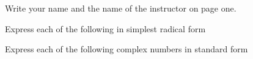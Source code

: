 \documentclass[11pt]{exam}
\begin{document}
\begin{questions}


\question[5] Write your name and the name of the instructor on page one. 

\addpoints
\question Express each of the following in simplest radical form

\newpage

\addpoints
\question Express each of the following complex numbers in standard form



\end{questions}
\end{document}
